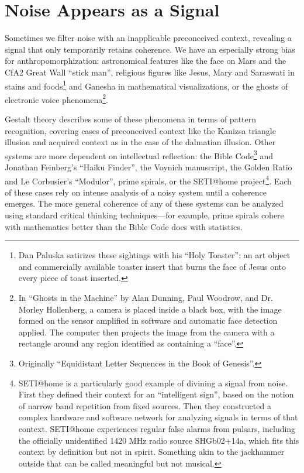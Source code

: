 \documentclass{thesis}
\begin{document}
\section{Noise Appears as a Signal}

Sometimes we filter noise with an inapplicable preconceived context, revealing a signal that only temporarily retains coherence. We have an especially strong bias for anthropomorphization: astronomical features like the face on Mars\cite{brian_dunning_facemars_2008} and the CfA2 Great Wall ``stick man''\cite{de_lapparent_slice_1986}, religious figures like Jesus, Mary and Saraswati in stains and foods\cite{boston.com_religious_????}\footnote{Dan Paluska satirizes these sightings with his ``Holy Toaster''\cite{dan_paluska_holy_2005}: an art object and commercially available toaster insert that burns the face of Jesus onto every piece of toast inserted.} and Ganesha in mathematical visualizations\cite{melinda_green_buddhabrot_1993}, or the ghosts of electronic voice phenomena\footnote{In ``Ghosts in the Machine'' by Alan Dunning, Paul Woodrow, and Dr. Morley Hollenberg\cite{alan_dunning_paul_woodrow_and_morley_hollenberg_einsteins_2008}, a camera is placed inside a black box, with the image formed on the sensor amplified in software and automatic face detection applied. The computer then projects the image from the camera with a rectangle around any region identified as containing a ``face''.}.

Gestalt theory describes some of these phenomena in terms of pattern recognition, covering cases of preconceived context like the Kanizsa triangle illusion\cite{alexander_bogomolny_kanizsa_????} and acquired context as in the case of the dalmatian illusion\cite{michael_bach_dalmatian_2002}. Other systems are more dependent on intellectual reflection: the Bible Code\footnote{Originally ``Equidistant Letter Sequences in the Book of Genesis''\cite{rips_equidistant_1994}.} and Jonathan Feinberg's ``Haiku Finder'', the Voynich manuscript\cite{robin_mckie_secret_2004}, the Golden Ratio\cite{Doczi81}\cite{markowsky_misconceptions_1992} and Le Corbusier's ``Modulor''\cite{padovan_proportion_1999}, prime spirals\cite{michael_m._ross_natural_2007}\cite{weisstein_prime_????}, or the SETI@home project\cite{seti_about_????}\footnote{SETI@home is a particularly good example of divining a signal from noise. First they defined their context for an ``intelligent sign'', based on the notion of narrow band repetition from fixed sources. Then they constructed a complex hardware and software network for analyzing signals in terms of that context. SETI@home experiences regular false alarms from pulsars, including the officially unidentified 1420 MHz radio source SHGb02+14a\cite{eugenie_samuel_reich_mysterious_2004}, which fits this context by definition but not in spirit. Something akin to the jackhammer outside that can be called meaningful but not musical.}. Each of these cases rely on intense analysis of a noisy system until a coherence emerges. The more general coherence of any of these systems can be analyzed using standard critical thinking techniques\cite{Moore07}---for example, prime spirals cohere with mathematics better than the Bible Code does with statistics.
\end{document}
